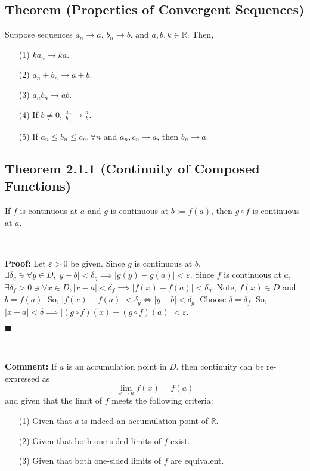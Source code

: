 \documentclass[11pt]{book}
\newcommand{\R}{\mathbb{R}}
\newcommand{\horline}{\noindent\rule{14.25cm}{0.6pt}\\}
\newcommand{\QED}{\begin{flushright}$\blacksquare$\end{flushright}}
\begin{document}
	\subsection{Theorem (Properties of Convergent Sequences)}
	\label{subsec:PCS}	
		\begin{theor}
			Suppose sequences $a_n \to a$, $b_n \to b$, and $a,b,k \in \R$. Then,
			\begin{enumerate}
				\item[(1)] $ka_n \to ka$.
				\item[(2)] $a_n + b_n \to a + b$.
				\item[(3)] $a_nb_n \to ab$.
				\item[(4)] If $b \neq 0$, $\frac{a_n}{b_n} \to \frac{a}{b}$.
				\item[(5)] If $a_n \leq b_n \leq c_n, \forall n$ and $a_n, c_n \to a$, then $b_n \to a$.
			\end{enumerate}
		\end{theor}
	\subsection{Theorem 2.1.1 (Continuity of Composed Functions)}
		\begin{theor}
			If $f$ is continuous at $a$ and $g$ is continuous at $b := f(a)$, then $g \circ f$ is continuous at $a$.\hfill\break
			\horline
			\textbf{Proof:} Let $\varepsilon > 0$ be given. Since $g$ is continuous at $b$, $\exists \delta_g \ni \forall y \in D, |y - b| < \delta_g
			\implies |g(y) - g(a)| < \varepsilon$. Since $f$ is continuous at $a$, $\exists \delta_f > 0 \ni \forall x \in D, |x-a| < \delta_f \implies
			|f(x) - f(a)| < \delta_g$. Note, $f(x) \in D$ and $b = f(a)$. So, $|f(x) - f(a)| < \delta_g \Leftrightarrow |y - b| < \delta_g$. Choose 
			$\delta = \delta_f$. So, $|x  - a| < \delta \implies |(g \circ f)(x) - (g \circ f)(a)| < \varepsilon$.
			\QED\hfill\break
			\horline
			\textbf{Comment:} If $a$ is an accumulation point in $D$, then continuity can be re-expressed as $$\displaystyle\lim_{x \to a}{f(x) = f(a)}$$
				and given that the limit of $f$ meets the following criteria:
				\begin{enumerate}
					\item[(1)] Given that $a$ is indeed an accumulation point of $\R$.
					\item[(2)] Given that both one-sided limits of $f$ exist.
					\item[(3)] Given that both one-sided limits of $f$ are equivalent.
				\end{enumerate}
						
		\end{theor}
\end{document}

